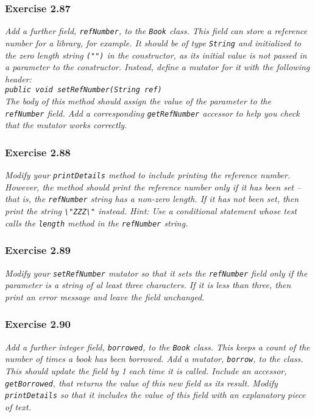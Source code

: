 \subsubsection*{Exercise 2.87}
\textit{Add a further field, \lstinline{refNumber}, to the \lstinline{Book} 
class. This field can store a reference number for a library, for example. It 
should be of type \lstinline{String} and initialized to the zero length string 
\lstinline{("")} in the constructor, as its initial value is not passed in a 
parameter to the constructor. Instead, define a mutator for it with the 
following header: \\
\lstinline{public void setRefNumber(String ref)}\\
The body of this method should assign the value of the parameter to the 
\lstinline{refNumber} field. Add a corresponding \lstinline{getRefNumber} 
accessor to help you check that the mutator works correctly. }\\

\subsubsection*{Exercise 2.88}
\textit{Modify your \lstinline{printDetails} method to include printing the 
reference number. However, the method should print the reference number only 
if it has been set -- that is, the \lstinline{refNumber} string has a non-zero 
length. If it has not been set, then print the string \lstinline{\"ZZZ\"} 
instead. Hint: Use a conditional statement whose test calls the 
\lstinline{length} method in the \lstinline{refNumber} string. }\\

\subsubsection*{Exercise 2.89}
\textit{Modify your \lstinline{setRefNumber} mutator so that it sets the 
\lstinline{refNumber} field only if the parameter is a string of al least 
three characters. If it is less than three, then print an error message and 
leave the field unchanged. }\\

\subsubsection*{Exercise 2.90}
\textit{Add a further integer field, \lstinline{borrowed}, to the 
\lstinline{Book} class. This keeps a count of the number of times a book has 
been borrowed. Add a mutator, \lstinline{borrow}, to the class. This should 
update the field by 1 each time it is called. Include an accessor, 
\lstinline{getBorrowed}, that returns the value of this new field as its 
result. Modify \lstinline{printDetails} so that it includes the value of this 
field with an explanatory piece of text. }\\

